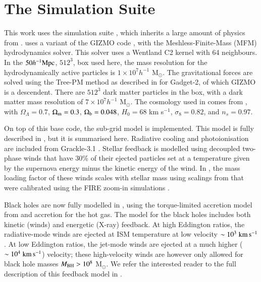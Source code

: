 \section{The \simba{} Simulation Suite}
\label{sec:simba}

This work uses the \simba{} simulation suite \citep{Dave2018}, which inherits a
large amount of physics from \mufasa{} \citep{Dave2016}. \simba{} uses a
variant of the GIZMO code \citep{Hopkins2015}, with the Meshless-Finite-Mass
(MFM) hydrodynamics solver. This solver uses a Wentland C2 kernel with 64
neighbours. In the $50 h^{-1}{\rm Mpc}{}$, $512^3$, box used here, the mass resolution for the
hydrodynamically active particles is $1\times10^7h^{-1}$ M$_\odot$. The
gravitational forces are solved using the Tree-PM method as described in
\citet{Springel2005b} for Gadget-2, of which GIZMO is a descendent. There are
$512^3$ dark matter particles in the box, with a dark matter mass resolution of
$7\times10^7h^{-1}$ M$_\odot$. The cosmology used in \simba{} comes from
\citet{PlanckCollaboration2016}, with $\Omega_\Lambda = 0.7$, $\Omega_{\rm m} =
0.3$, $\Omega_{\rm b} = 0.048$, $H_0 = 68$ km s$^{-1}$, $\sigma_8=0.82$, and
$n_s=0.97$.

On top of this base code, the \simba{} sub-grid model is implemented. This
model is fully described in \citet{Dave2018}, but it is summarised here.
Radiative cooling and photoionisation are included from Grackle-3.1
\citep{Smith2016}. Stellar feedback is modelled using decoupled two-phase winds
that have 30\% of their ejected particles set at a temperature given by the
supernova energy minus the kinetic energy of the wind. In \simba{}, the mass
loading factor of these winds scales with stellar mass using scalings from
\citet{Muratov2015} that were calibrated using the FIRE zoom-in simulations
\citep{Hopkins2014}.

Black holes are now fully modelled in \simba{}, using the torque-limited
accretion model from \citet{AnglesAlcazar2017b} and \citet{Bondi1952} accretion
for the hot gas. The model for the black holes includes both kinetic (winds)
and energetic (X-ray) feedback. At high Eddington ratios, the radiative-mode
winds are ejected at ISM temperature at low velocity $\sim 10^3 \;{\rm km}\,{\rm s}^{-1}{}$.
At low Eddington ratios, the jet-mode winds are ejected at a much higher ($\sim
10^4\;{\rm km}\,{\rm s}^{-1}{}$) velocity; these high-velocity winds are however only allowed
for black hole masses $M_{\rm BH} > 10^8$ M$_\odot$. We refer the interested
reader to the full description of this feedback model in \citet{Dave2018}.


